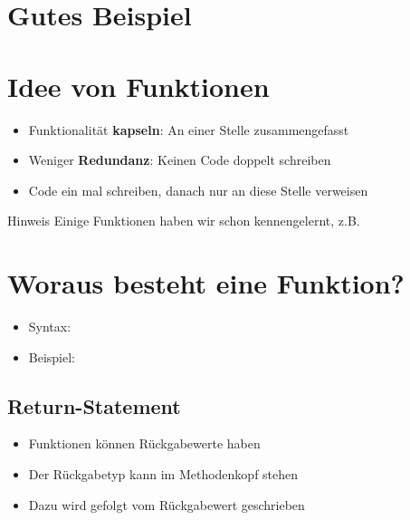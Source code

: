 \section{Gutes Beispiel}
\begin{frame}
    \slidehead
\end{frame}

\section{Idee von Funktionen}
\begin{frame}[<+->]
    \slidehead

    \begin{itemize}
        \item Funktionalität \textbf{kapseln}: An einer Stelle zusammengefasst
        \item Weniger \textbf{Redundanz}: Keinen Code doppelt schreiben
        \item Code ein mal schreiben, danach nur an diese Stelle verweisen
    \end{itemize}
    \begin{block}{Hinweis}
        Einige Funktionen haben wir schon kennengelernt, z.B. 
    \end{block}
\end{frame}

\subtitle{Kapitel 6: wie Funktionen funktionieren}

\section{Woraus besteht eine Funktion?}
\begin{frame}[c]
    \slidehead
    \begin{itemize}[<+->]
        \item Syntax: 
        \item Beispiel: 
    \end{itemize}
\end{frame}

\subsection{Return-Statement}
\begin{frame}
    \slidehead
    \begin{itemize}
        \item<1-> Funktionen können Rückgabewerte haben
        \item<2-> Der Rückgabetyp kann im Methodenkopf stehen
        \item<3-> Dazu wird  gefolgt vom Rückgabewert geschrieben
    \end{itemize}
\end{frame}

